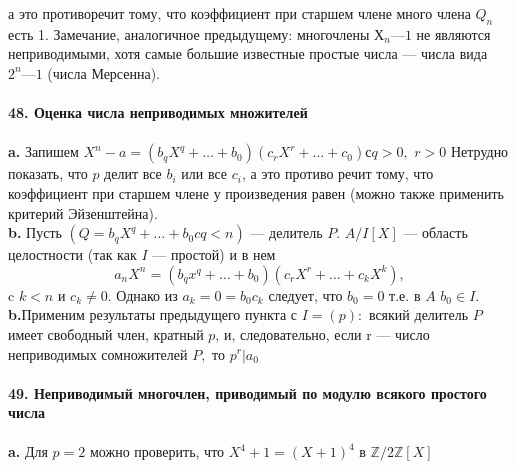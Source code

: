 \pagebreak
\noindent а это противоречит тому, что коэффициент при старшем члене много­\linebreak
члена $Q_n$ есть 1. Замечание, аналогичное предыдущему: многочлены\linebreak
$Х_n — 1$ не являются неприводимыми, хотя самые большие известные\linebreak
простые числа — числа вида $2^{n} — 1$ (числа Мерсенна).\\
\\
\noindent\textbf{48. Оценка числа неприводимых множителей}\\
\\
\hspace*{15pt}\textbf{a.} Запишем $X^{n} - a = (b_{q}X^{q}+\ldots+ b_0)(c_{r}X^r+\ldots+c_0) с q > 0,$\linebreak
$r > 0$ Нетрудно показать, что $p$ делит все $b_i$ или все $c_i$, а это противо­\linebreak
речит тому, что коэффициент при старшем члене у произведения равен (можно также применить критерий Эйзенштейна).\\
\hspace*{15pt}\textbf{b.} Пусть $(Q = b_{q}X^{q}+\ldots+b_0 c q< n)$ --- делитель $P$. $A/I[X]$ ---\linebreak
область целостности (так как $I$ --- простой) и в нем
$$a_{n}X^{n} = (b_{q}x^{q}+\ldots+b_0)(c_{r}X^{r}+\ldots+c_{k}X^{k}),$$
c $k < n$ и $c_k \neq 0.$ Однако из $a_k = 0 = b_{0}c_k$ следует, что $b_0 = 0 $ т.е. в $A$\linebreak
$b_0 \in I.$\\
\hspace*{15pt}\textbf{b.}Применим результаты предыдущего пункта с $I = (p):$ всякий\linebreak
делитель $P$ имеет свободный член, кратный $p$, и, следовательно, если\linebreak 
r --- число неприводимых сомножителей $P,$ то $p^r | a_0$\\
\\
\indent\textbf{49. Неприводимый многочлен, приводимый по модулю
всякого простого числа}\\
\\
\hspace*{15pt}\textbf{a.} Для $p = 2$ можно проверить, что $X^{4} + 1 = (X + 1)^{4}$ в $\mathbb{Z}/2\mathbb{Z}[X]$\\
